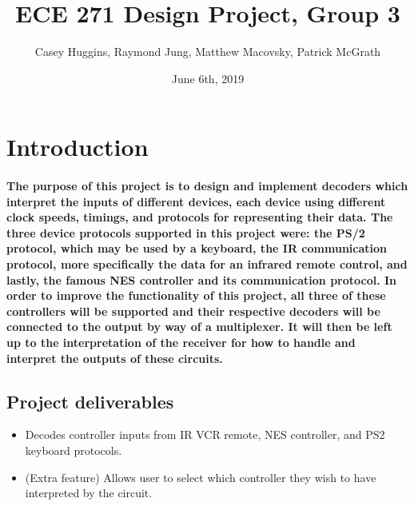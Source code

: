 \documentclass[a4paper]{article}
\title{ECE 271 Design Project, Group 3}
\author{Casey Huggins, Raymond Jung, Matthew Macovsky, Patrick McGrath}
\date{June 6th, 2019}
\begin{document}

\maketitle
\tableofcontents
\newpage
\section{Introduction}

\paragraph{The purpose of this project is to design and implement decoders which interpret the inputs of different devices, each device using different clock speeds, timings, and protocols for representing their data. The three device protocols supported in this project were: the PS/2 protocol, which may be used by a keyboard, the IR communication protocol, more specifically the data for an infrared remote control, and lastly, the famous NES controller and its communication protocol. In order to improve the functionality of this project, all three of these controllers will be supported and their respective decoders will be connected to the output by way of a multiplexer. It will then be left up to the interpretation of the receiver for how to handle and interpret the outputs of these circuits.}

\subsection{Project deliverables}
\begin{itemize}
\item Decodes controller inputs from IR VCR remote, NES controller, and PS2 keyboard protocols.
\item (Extra feature) Allows user to select which controller they wish to have interpreted by the circuit.
\end{itemize}
\end{document}
